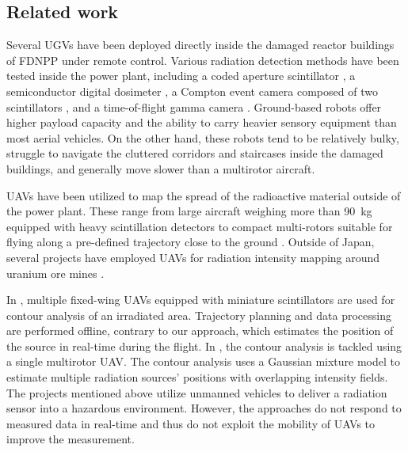 \documentclass[a4paper,11pt,titlepage,twoside]{book}
\begin{document}
\subsection{Related work}



Several \acp{UGV} have been deployed directly inside the damaged reactor buildings of \ac{FDNPP} under remote control.
Various radiation detection methods have been tested inside the power plant, including a coded aperture scintillator \cite{ohno2011robotic}, a semiconductor digital dosimeter \cite{nagatani2013emergency}, a Compton event camera composed of two scintillators \cite{sato2019radiation}, and a time-of-flight gamma camera \cite{kinoshita2014development}.
Ground-based robots offer higher payload capacity and the ability to carry heavier sensory equipment than most aerial vehicles.
On the other hand, these robots tend to be relatively bulky, struggle to navigate the cluttered corridors and staircases inside the damaged buildings, and generally move slower than a multirotor aircraft.

\acp{UAV} have been utilized to map the spread of the radioactive material outside of the power plant.
These range from large aircraft weighing more than \SI{90}{\kilogram} equipped with heavy scintillation detectors \cite{sanada2015aerial, towler2012radiation, jiang2016prototype}
to compact multi-rotors suitable for flying along a pre-defined trajectory close to the ground \cite{macfarlane2014lightweight, christie2017radiation, martin20163d}.
Outside of Japan, several projects have employed \acp{UAV} for radiation intensity mapping around uranium ore mines \cite{salek2018mapping, keatley2018source, martin2015use}.

In \cite{han2013lowcost}, multiple fixed-wing \acp{UAV} equipped with miniature scintillators are used for contour analysis of an irradiated area.
Trajectory planning and data processing are performed offline, contrary to our approach, which estimates the position of the source in real-time during the flight.
In \cite{newaz2016uav}, the contour analysis is tackled using a single multirotor \ac{UAV}. The contour analysis uses a Gaussian mixture model to estimate multiple radiation sources' positions with overlapping intensity fields.
The projects mentioned above utilize unmanned vehicles to deliver a radiation sensor into a hazardous environment.
However, the approaches do not respond to measured data in real-time and thus do not exploit the mobility of \acp{UAV} to improve the measurement.
\end{document}
